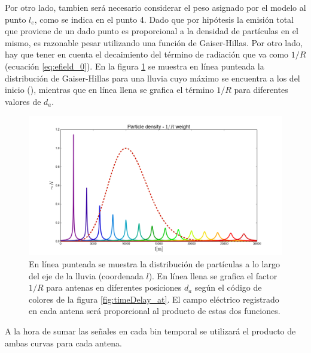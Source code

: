 	Por otro lado, tambien será necesario considerar el peso asignado por el modelo al punto $l_e$, como se indica en el punto 4. 
	Dado que por hip\'otesis la emisi\'on total que proviene de un dado punto es proporcional a la densidad de partículas en el mismo, es razonable pesar utilizando una función de Gaiser-Hillas.
	Por otro lado, hay que tener en cuenta el decaimiento del término de radiación que va como $1/R$ (ecuaci\'on \ref{eq:efield_0}).
	En la figura \ref{fig:timeDelay_pd} se muestra en línea punteada la distribución de Gaiser-Hillas para una lluvia cuyo máximo se encuentra a los  del inicio (), mientras que en línea llena se grafica el término $1/R$ para diferentes valores de $d_a$.
	\begin{figure}[ht!]
		\centering
		\includegraphics[width=\textwidth]{./fig/EASRadio/timeDelay_pd}
		\caption{\label{fig:timeDelay_pd}
		En l\'inea punteada se muestra la distribuci\'on de part\'iculas a lo largo del eje de la lluvia (coordenada $l$). En l\'inea llena se grafica el factor $1/R$ para antenas en diferentes posiciones $d_a$ seg\'un el c\'odigo de colores de la figura \ref{fig:timeDelay_at}.
		El campo el\'ectrico registrado en cada antena ser\'a proporcional al producto de estas dos funciones.
		}
	\end{figure}
	A la hora de sumar las señales en cada bin temporal se utilizará el producto de ambas curvas para cada antena.
	
